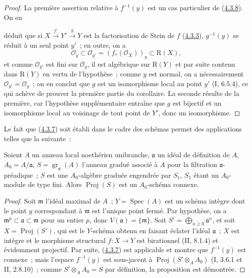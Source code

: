 \begin{proof}
La première assertion relative à $f^{-1}(y)$ est un cas particulier de
(\hyperref[III.4.3.8-fr]{4.3.8}). On en


déduit que si $X\xrightarrow{f'}Y'\xrightarrow{g}Y$ est la factorisation
de Stein de $f$ (\hyperref[III.4.3.3-fr]{4.3.3}), $g^{-1}(y)$ se réduit à
un seul point $y'$~; en outre, on a
\[
\mathcal O_y\subset\mathcal O_{y'}=(f_*(\mathcal O_X))_y
\subset\mathrm R(X),
\]
et comme $\mathcal O_{y'}$ est fini sur $\mathcal O_y$, il est algébrique sur
$\mathrm R(Y)$ et par suite contenu dans $\mathrm R(Y)$ en vertu
de l'hypothèse~; comme $y$ est normal, on a nécessairement
$\mathcal O_{y'}=\mathcal O_y$~; on en conclut que $g$ est un isomorphisme
local au point $y'$ (I, 6.5.4), ce qui achève de prouver la première partie
du corollaire. La seconde résulte de la première, car l'hypothèse
supplémentaire entraîne que $g$ est bijectif et un isomorphisme local au
voisinage de tout point de $Y'$, donc un isomorphisme.
\end{proof}

Le fait que (\hyperref[III.4.3.7-fr]{4.3.7}) soit établi dans le cadre des
schémas permet des applications telles que la suivante~:

\begin{proposition}[4.3.13]
\label{III.4.3.13-fr}
Soient $A$ un anneau local noethérien unibranche, $\mathfrak a$ un idéal de
définition de $A$, $A_0=A/\mathfrak a$,
$S=\operatorname{gr}_{\mathfrak a}(A)$ l'anneau gradué associé à $A$ pour
la filtration $\mathfrak a$-préadique~; $S$ est une $A_0$-algèbre graduée
engendrée par $S_1$, $S_1$ étant un $A_0$-module de type fini. Alors
$\operatorname{Proj}(S)$ est un $A_0$-schéma connexe.
\end{proposition}

\begin{proof}
Soit $\mathfrak m$ l'idéal maximal de $A$~; $Y=\operatorname{Spec}(A)$ est
un schéma intègre dont le point $y$ correspondant à $\mathfrak m$ est
l'unique point fermé. Par hypothèse, on a
$\mathfrak m^p\subset\mathfrak a\subset\mathfrak m$ pour un entier $p$,
donc $V(\mathfrak a)=\{\mathfrak m\}$. Soit
$S'=\bigoplus_{n\geq0}\mathfrak a^n$, et soit
$X=\operatorname{Proj}(S')$, qui est le $Y$-schéma obtenu en faisant éclater
l'idéal $\mathfrak a$~; $X$ est intègre et le morphisme structural
$f:X\to Y$ est birationnel (II, 8.1.4) et évidemment projectif. Par suite,
(\hyperref[III.4.3.7-fr]{4.3.7}) est applicable et montre que $f^{-1}(y)$
est connexe~; mais l'espace $f^{-1}(y)$ est sous-jacent à
$\operatorname{Proj}(S'\otimes_AA_0)$ (I, 3.6.1 et II, 2.8.10)~; comme
$S'\otimes_AA_0=S$ par définition, la proposition est démontrée.
\end{proof}


